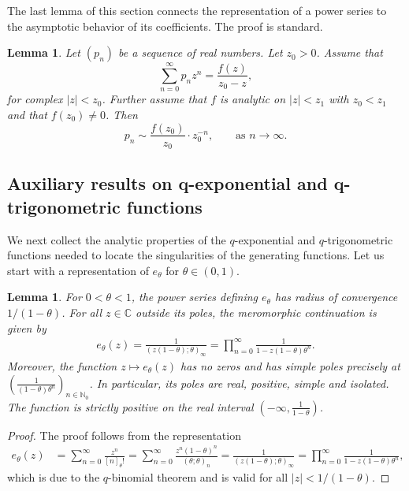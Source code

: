 \documentclass[10pt,a4paper]{amsart}
\newcommand{\N}{\mathbb{N}} %
\newcommand{\C}{\mathbb{C}} %
\newcommand{\1}{\mathds{1}}
\newtheorem{Lemma}[definition]{Lemma}
\begin{document}
The last lemma of this section connects the representation of a power series to the asymptotic behavior of its coefficients. The proof is standard.
\begin{Lemma}\label{asymptotic_powerseries}
    Let $(p_n)$ be a sequence of real numbers. Let $z_0>0$. Assume that
\begin{equation}
\sum_{n=0}^\infty p_n z^n = \frac{f(z)}{z_0-z},
\end{equation}
for complex $|z| < z_0$. Further assume that $f$ is analytic on $|z|<z_1$ with $z_0<z_1$ and that $f(z_0)\neq 0$. Then
$$
p_n \sim \frac{f(z_0)}{z_0} \cdot z_0^{-n},\qquad \text{as $n\to\infty$.}
$$
\end{Lemma}
\subsection{Auxiliary results on q-exponential and q-trigonometric functions} \label{sec:auxiliaryqexpetc}
We next collect the analytic properties of the $q$-exponential and $q$-trigonometric functions needed to locate the singularities of the generating functions. Let us start with a representation of $e_\theta$ for $\theta\in(0,1)$.
\begin{Lemma}\label{e_theta_singularities_thetale1}
   For $0<\theta< 1$, the power series defining $e_\theta$ has
radius of convergence $1/(1-\theta)$. For all $z\in\C$ outside its poles, the meromorphic continuation is given by
   \begin{align}\label{e_theta_prod_thetale1}
       e_\theta(z)=\frac{1}{(z(1-\theta);\theta)_\infty}=\prod_{n=0}^\infty\frac{1}{1-z(1-\theta)\theta^n}.
   \end{align}
   Moreover,  the function $z\mapsto e_\theta(z)$ has no zeros and has simple poles precisely at $\left(\frac{1}{(1-\theta)\theta^n}\right)_{n\in\N_0}$. In particular, its poles are real, positive, simple and isolated. The function is strictly positive on the real interval $\left(-\infty,\frac{1}{1-\theta}\right)$.
\end{Lemma}
\begin{proof}
The proof follows from the representation
    \begin{align*}
        e_{\theta}(z)
        &= \sum_{n=0}^\infty \frac{z^{n}}{[n]_{\theta}!}=\sum_{n=0}^\infty\frac{z^n(1-\theta)^n}{(\theta;\theta)_n}=\frac{1}{(z(1-\theta);\theta)_\infty}=\prod_{n=0}^\infty\frac{1}{1-z(1-\theta)\theta^n},
    \end{align*}
    which is due to the $q$-binomial theorem and is valid for all $|z|<1/(1-\theta)$.
\end{proof}
\end{document}

